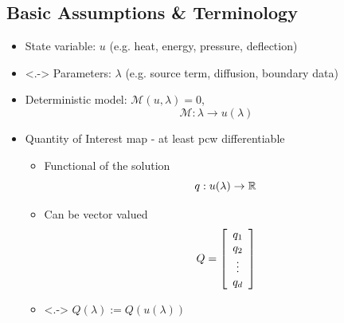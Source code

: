 \subsection{Basic Assumptions \& Terminology}
\begin{frame}[t]

\begin{itemize}[<+->]
	\item State variable: $u$ {\color{gray}(e.g. heat, energy, pressure, deflection)}
	\vskip 10pt
	\item<.-> Parameters: $\lambda$ {\color{gray}(e.g. source term, diffusion, boundary data)}
	\vskip 10pt
		\item Deterministic model: $\mathcal{M} (u, \lambda) = 0$, $$\mathcal{M}:\lambda \to u(\lambda)$$

	\item Quantity of Interest map  - at least pcw differentiable \vskip 5pt
		\begin{itemize}[<+->]
		\item Functional of the solution $$q: u(\lambda) \to \RR$$
		\item Can be vector valued $$Q = \mat{c}{q_1\\ q_2\\ \vdots \\ q_d}$$
		\item<.-> $Q(\lambda) := Q(u(\lambda))$
	\end{itemize}
	
\end{itemize}

\end{frame}


